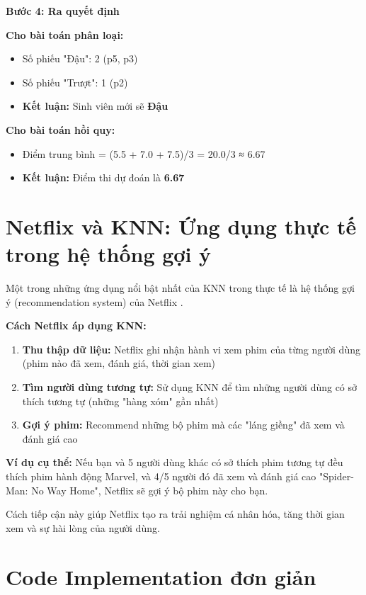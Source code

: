 \textbf{Bước 4: Ra quyết định}

\textbf{Cho bài toán phân loại:}
\begin{itemize}
\item Số phiếu "Đậu": 2 (p5, p3)
\item Số phiếu "Trượt": 1 (p2)
\item \textbf{Kết luận:} Sinh viên mới sẽ \textbf{Đậu}
\end{itemize}

\textbf{Cho bài toán hồi quy:}
\begin{itemize}
\item Điểm trung bình = (5.5 + 7.0 + 7.5)/3 = 20.0/3 ≈ 6.67
\item \textbf{Kết luận:} Điểm thi dự đoán là \textbf{6.67}
\end{itemize}

\section{Netflix và KNN: Ứng dụng thực tế trong hệ thống gợi ý}

Một trong những ứng dụng nổi bật nhất của KNN trong thực tế là hệ thống gợi ý (recommendation system) của Netflix \cite{netflix_recommendation_2023}. 

\textbf{Cách Netflix áp dụng KNN:}
\begin{enumerate}
\item \textbf{Thu thập dữ liệu:} Netflix ghi nhận hành vi xem phim của từng người dùng (phim nào đã xem, đánh giá, thời gian xem)
\item \textbf{Tìm người dùng tương tự:} Sử dụng KNN để tìm những người dùng có sở thích tương tự (những "hàng xóm" gần nhất)
\item \textbf{Gợi ý phim:} Recommend những bộ phim mà các "láng giềng" đã xem và đánh giá cao
\end{enumerate}

\textbf{Ví dụ cụ thể:} Nếu bạn và 5 người dùng khác có sở thích phim tương tự đều thích phim hành động Marvel, và 4/5 người đó đã xem và đánh giá cao "Spider-Man: No Way Home", Netflix sẽ gợi ý bộ phim này cho bạn.

Cách tiếp cận này giúp Netflix tạo ra trải nghiệm cá nhân hóa, tăng thời gian xem và sự hài lòng của người dùng.

\section{Code Implementation đơn giản}

